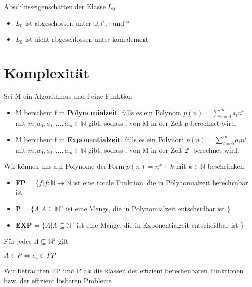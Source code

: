 \documentclass[14pt]{article}
\begin{document}
\begin{eigenschaft}
    Abschlusseigenschaften der Klasse \textbf{$L_0$}
    \begin{itemize}
        \item $L_0$ ist abgeschossen unter $\cup, \cap, \cdot$ und $*$
        \item $L_0$ ist nicht abgeschlossen unter komplement 
    \end{itemize}
\end{eigenschaft}
\section{Komplexität}
\begin{definition}
    Sei M ein Algorithmus und f eine Funktion
    \begin{itemize}
        \item M berechent f in \textbf{Polynomialzeit}, falls es ein Polynom
        $p(n) = \sum_{i = 0}^m a_in^i$ mit $m, a_0,a_1,\dots,a_m \in \mathbb{N}$ gibt, sodass
        f von M in der Zeit p berechnet wird.
        \item M berechent f in \textbf{Exponentialzeit}, falls es ein Polynom
        $p(n) = \sum_{i = 0}^m a_in^i$ mit $m, a_0,a_1,\dots,a_m \in \mathbb{N}$ gibt, sodass
        f von M in der Zeit $2^p$ berechnet wird.
    \end{itemize}
    Wir können uns auf Polynome der Form $p(n) = n^k + k$ mit $k \in \mathbb{N}$
    beschränken. 
\end{definition}
\begin{definition}
    \begin{itemize}
        \item \textbf{FP} = $\{ f | f: \mathbb{N} \rightarrow \mathbb{N}$ ist eine totale Funktion, die
        in Polynomialzeit berechenbar ist
        \item \textbf{P} = $\{ A | A \subseteq \mathbb{N}^n$ ist eine Menge, die
        in Polynomialzeit entscheidbar ist \}
        \item \textbf{EXP} = $\{ A | A \subseteq \mathbb{N}^n$ ist eine Menge, die
        in Exponentialzeit entscheidbar ist \}
    \end{itemize}
    Für jedes $A \subseteq \mathbb{N}^n$ gilt
    \begin{center}
        $A \in P \Leftrightarrow c_a \in FP$
    \end{center}
    Wir betrachten FP und P als die klassen der effizient berechenbaren 
    Funktionen bzw. der effizient lösbaren Probleme
\end{definition}
\end{document}
